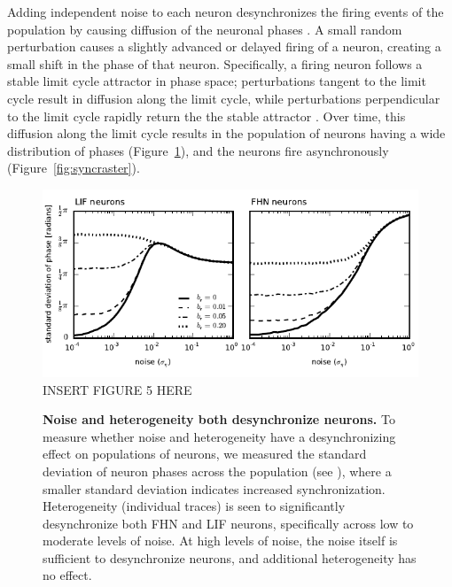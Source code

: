 \documentclass[12pt]{article}
\begin{document}
Adding independent noise to each neuron desynchronizes the firing events of the population by causing diffusion of the neuronal phases \citep{Stocks2001a}. A small random perturbation causes a slightly advanced or delayed firing of a neuron, creating a small shift in the phase of that neuron. Specifically, a firing neuron follows a stable limit cycle attractor in phase space; perturbations tangent to the limit cycle result in diffusion along the limit cycle, while perturbations perpendicular to the limit cycle rapidly return the the stable attractor \citep{Tomita1974}. Over time, this diffusion along the limit cycle results in the population of neurons having a wide distribution of phases (Figure~\ref{fig:phase}), and the neurons fire asynchronously (Figure~\ref{fig:syncraster}).

\begin{figure}
  \ifx\hidefigures\undefined
    \centering
    \includegraphics[width=\textwidth]{figure5_phase.pdf}
  \else
    INSERT FIGURE 5 HERE
  \fi
  \caption{
    \textbf{Noise and heterogeneity both desynchronize neurons.} To measure whether noise and heterogeneity have a desynchronizing effect on populations of neurons, we measured the standard deviation of neuron phases across the population (see \textsc{}), where a smaller standard deviation indicates increased synchronization. Heterogeneity (individual traces) is seen to significantly desynchronize both FHN and LIF neurons, specifically across low to moderate levels of noise. At high levels of noise, the noise itself is sufficient to desynchronize neurons, and additional heterogeneity has no effect.
  }
  \label{fig:phase}
\end{figure}
\end{document}
